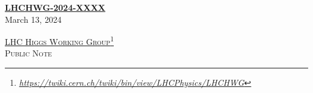 \documentclass[11pt]{article}
\begin{document}
\hypersetup{pageanchor=false}

\thispagestyle{empty}
\begin{titlepage}
  
  \begin{flushright}
    {\large
      \textbf{\href{https://https://cds.cern.ch/record/XXXXX}{LHCHWG-2024-XXXX}}} \\[0.5cm]	
    {\large 	\textrm{March 13, 2024}} \\[2.0cm]
  \end{flushright}
  
  \begin{center}
    
    \textsc{\Large 	\href{https://twiki.cern.ch/twiki/bin/view/LHCPhysics/LHCHWG}{LHC Higgs Working Group}\footnote{\href{https://twiki.cern.ch/twiki/bin/view/LHCPhysics/LHCHWG}{\sl https://twiki.cern.ch/twiki/bin/view/LHCPhysics/LHCHWG}}} \\[0.5cm]
    \textsc{\Large 	Public Note} \\[1.5cm]
    

\end{center}
\end{titlepage}
\end{document}
